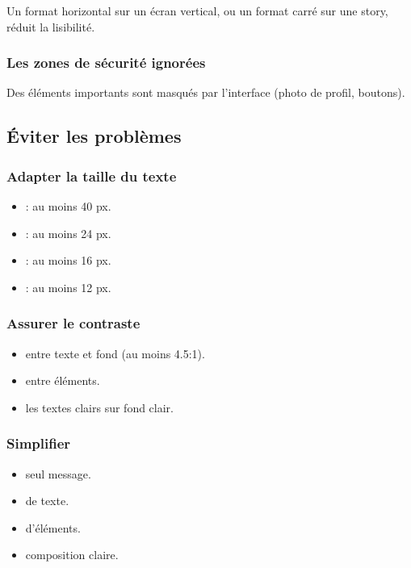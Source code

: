 Un format horizontal sur un écran vertical, ou un format carré sur une story, réduit la lisibilité.

\subsubsection{Les zones de sécurité ignorées}

Des éléments importants sont masqués par l'interface (photo de profil, boutons).

\subsection{Éviter les problèmes}

\subsubsection{Adapter la taille du texte}

\begin{itemize}
    \item {} : au moins 40 px.
    \item {} : au moins 24 px.
    \item {} : au moins 16 px.
    \item {} : au moins 12 px.
\end{itemize}

\subsubsection{Assurer le contraste}

\begin{itemize}
    \item {} entre texte et fond (au moins 4.5:1).
    \item {} entre éléments.
    \item {} les textes clairs sur fond clair.
\end{itemize}

\subsubsection{Simplifier}

\begin{itemize}
    \item {} seul message.
    \item {} de texte.
    \item {} d'éléments.
    \item {} composition claire.
\end{itemize}

